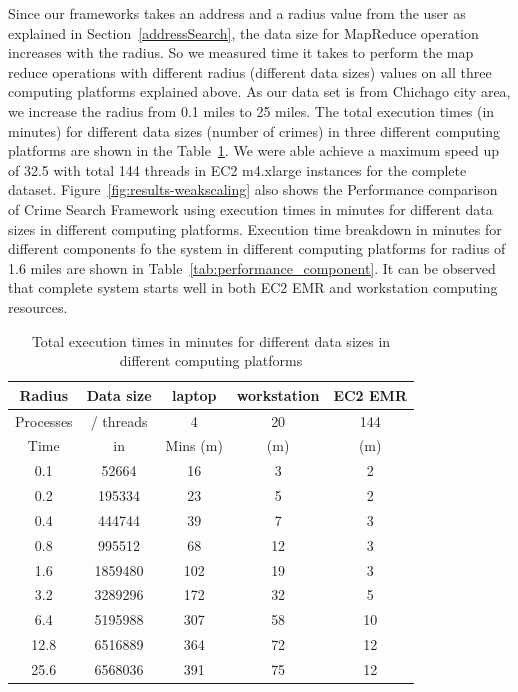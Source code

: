 Since our frameworks takes an address and a radius value from the user
as explained in Section~\ref{addressSearch}, the data size for
MapReduce operation increases with the radius. So we measured time it
takes to perform the map reduce operations with different radius
(different data sizes) values on all three computing platforms
explained above. As our data set is from Chichago city area, we
increase the radius from 0.1 miles to 25 miles. The total execution
times (in minutes) for different data sizes (number of crimes) in
three different computing platforms are shown in the
Table~\ref{tab:performance}. We were able achieve a maximum speed up
of 32.5 with total 144 threads in EC2 m4.xlarge instances for the
complete dataset. Figure~\ref{fig:results-weakscaling} also shows the
Performance comparison of Crime Search Framework using execution times
in minutes for different data sizes in different computing
platforms. Execution time breakdown in minutes for different
components fo the system in different computing platforms for radius
of 1.6 miles are shown in Table~\ref{tab:performance_component}. It
can be observed that complete system starts well in both EC2 EMR and
workstation computing resources.

\begin{table}[htb]
	\centering
	\caption{Total execution times in minutes for different data
        sizes in different computing platforms}\label{tab:performance}
	\begin{tabular}{*{5}{c}}
		\toprule
		Radius & Data size &  laptop & workstation &  EC2 EMR \\
		\midrule
		Processes & / threads &  4  & 20 &  144 \\
		\midrule
		Time & in &  Mins (m) & (m) &  (m) \\
		\midrule
		0.1 & 52664  & 16  & 3 &  2 \\
		0.2 & 195334 & 23  & 5 &  2 \\
		0.4 & 444744 & 39  & 7 &  3 \\
		0.8 & 995512 & 68  & 12 &  3 \\
		1.6 & 1859480 & 102  & 19 &  3 \\
		3.2 & 3289296 & 172  & 32 &  5 \\
		6.4 & 5195988 &  307 & 58 &  10 \\
		12.8 & 6516889 & 364  & 72 &  12 \\
		25.6 & 6568036 & 391  & 75 &  12 \\

		\bottomrule
	\end{tabular}
\end{table}

